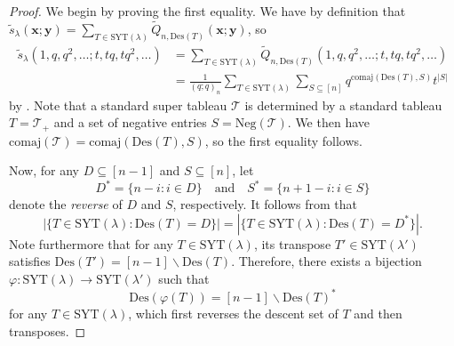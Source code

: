 \documentclass[11pt]{article}
\theoremstyle{definition}
\numberwithin{equation}{section}
\newcommand\comaj{\mathrm{comaj}}
\newcommand\Des{\mathrm{Des}}
\newcommand\Neg{\mathrm{Neg}}
\newcommand\SYT{\mathrm{SYT}}
\newcommand\xb{\mathbf{x}}
\newcommand\yb{\mathbf{y}}
\newcommand\Qtil{\widetilde{Q}}
\newcommand\stil{\tilde{s}}
\begin{document}
\begin{proof}
    We begin by proving the first equality. We have by definition that $\stil_\lambda(\xb;\yb) = \sum_{T \in \SYT(\lambda)} \Qtil_{n,\Des(T)}(\xb;\yb)$, so
    \begin{align*}
        \stil_\lambda(1,q,q^2,\ldots;t,tq,tq^2,\ldots) &= \sum_{T \in \SYT(\lambda)} \Qtil_{n,\Des(T)}(1,q,q^2,\ldots;t,tq,tq^2,\ldots) \\
        &= \frac{1}{(q;q)_n} \sum_{T \in \SYT(\lambda)} \sum_{S \subseteq [n]} q^{\comaj(\Des(T),S)} t^{|S|}
    \end{align*}
    by . Note that a standard super tableau $\mathcal{T}$ is determined by a standard tableau $T = \mathcal{T}_+$ and a set of negative entries $S = \Neg(\mathcal{T})$. We then have $\comaj(\mathcal{T}) = \comaj(\Des(T),S)$, so the first equality follows.

    Now, for any $D \subseteq [n-1]$ and $S \subseteq [n]$, let 
    \[
    D^* = \{ n-i : i \in D \} \quad \text{and} \quad S^* = \{ n+1-i : i \in S \}
    \]
    denote the \emph{reverse} of $D$ and $S$, respectively. It follows from \cite[Prop.~7.19.2]{Stan} that
    \[
    |\{ T \in \SYT(\lambda) : \Des(T) = D \}| = |\{ T \in \SYT(\lambda) : \Des(T) = D^* \}|.
    \]
    Note furthermore that for any $T \in \SYT(\lambda)$, its transpose $T' \in \SYT(\lambda')$ satisfies $\Des(T') = [n-1] \backslash \Des(T)$. Therefore, there exists a bijection $\varphi : \SYT(\lambda) \to \SYT(\lambda')$ such that
    \[
    \Des(\varphi(T)) = [n-1] \backslash \Des(T)^*
    \]
    for any $T \in \SYT(\lambda)$, which first reverses the descent set of $T$ and then transposes. 
    

\end{proof}
\end{document}
